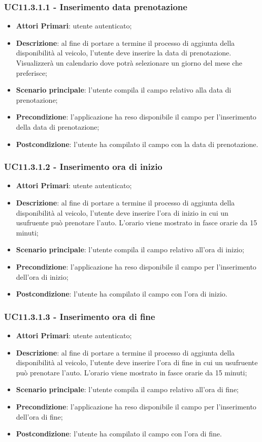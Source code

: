 \subsubsection{UC11.3.1.1 - Inserimento data prenotazione}
\begin{itemize}
	\item \textbf{Attori Primari}: utente autenticato;
	\item \textbf{Descrizione}: al fine di portare a termine il processo di aggiunta della disponibilità al veicolo, l'utente deve inserire la data di prenotazione. Visualizzerà un calendario dove potrà selezionare un giorno del mese che preferisce;
	\item \textbf{Scenario principale}: l'utente compila il campo relativo alla data di prenotazione;	
	\item \textbf{Precondizione}: l'applicazione ha reso disponibile il campo per l'inserimento della data di prenotazione;
	\item \textbf{Postcondizione}: l'utente ha compilato il campo con la data di prenotazione.	
\end{itemize}
\subsubsection{UC11.3.1.2 - Inserimento ora di inizio}
\begin{itemize}
	\item \textbf{Attori Primari}: utente autenticato;
	\item \textbf{Descrizione}: al fine di portare a termine il processo di aggiunta della disponibilità al veicolo, l'utente deve inserire l'ora di inizio in cui un usufruente può prenotare l'auto. L'orario viene mostrato in fasce orarie da 15 minuti;
	\item \textbf{Scenario principale}: l'utente compila il campo relativo all'ora di inizio;	
	\item \textbf{Precondizione}: l'applicazione ha reso disponibile il campo per l'inserimento dell'ora di inizio;
	\item \textbf{Postcondizione}: l'utente ha compilato il campo con l'ora di inizio.	
\end{itemize}
\subsubsection{UC11.3.1.3 - Inserimento ora di fine}
\begin{itemize}
	\item \textbf{Attori Primari}: utente autenticato;
	\item \textbf{Descrizione}: al fine di portare a termine il processo di aggiunta della disponibilità al veicolo, l'utente deve inserire l'ora di fine in cui un usufruente può prenotare l'auto. L'orario viene mostrato in fasce orarie da 15 minuti;
	\item \textbf{Scenario principale}: l'utente compila il campo relativo all'ora di fine;	
	\item \textbf{Precondizione}: l'applicazione ha reso disponibile il campo per l'inserimento dell'ora di fine;
	\item \textbf{Postcondizione}: l'utente ha compilato il campo con l'ora di fine.	
\end{itemize}
